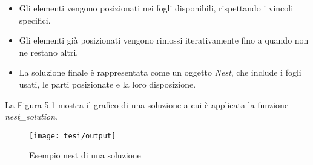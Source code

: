 \begin{itemize}
    \item Gli elementi vengono posizionati nei fogli disponibili, rispettando i vincoli specifici.
    \item Gli elementi già posizionati vengono rimossi iterativamente fino a quando non ne restano altri.
    \item La soluzione finale è rappresentata come un oggetto \emph{Nest}, che include i fogli usati, le parti posizionate e la loro disposizione.
\end{itemize}

La Figura 5.1 mostra il grafico di una soluzione a cui è applicata la funzione \emph{nest\_solution}.

\begin{figure}[!ht] 
    \centering 
    \texttt{[image: tesi/output]} 
    \caption{Esempio nest di una soluzione}
\end{figure}















